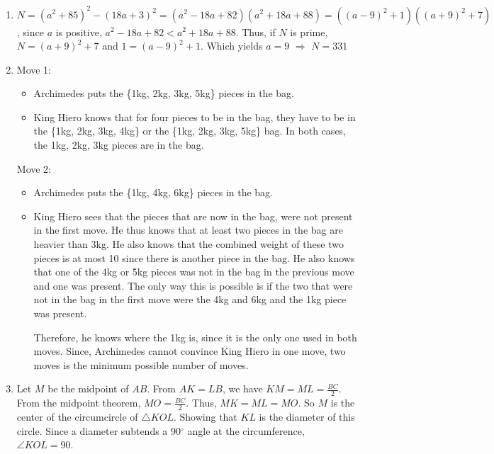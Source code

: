 \documentclass{article}
\begin{document}
\begin{enumerate}
\item $N =(a^{2} + 85)^{2} - (18a+3)^{2} = (a^{2} -18a + 82)(a^{2} + 18a + 88) = ((a-9)^{2} + 1)((a+9)^{2} + 7)$, since $a$ is positive, $a^{2} -18a + 82 < a^{2} + 18a + 88$. Thus, if $N$ is prime, $N = (a+9)^{2} + 7$ and $1 = (a-9)^{2} + 1$. Which yields $a = 9$ $\Rightarrow$ $N = 331$

\item Move 1:
\begin{itemize}
    \item Archimedes puts the \{1kg, 2kg, 3kg, 5kg\} pieces in the bag.
    \item King Hiero knows that for four pieces to be in the bag, they have to be in the \{1kg, 2kg, 3kg, 4kg\} or the \{1kg, 2kg, 3kg, 5kg\} bag. In both cases, the 1kg, 2kg, 3kg pieces are in the bag.
\end{itemize}
Move 2:
\begin{itemize}
    \item Archimedes puts the \{1kg, 4kg, 6kg\} pieces in the bag.
    \item King Hiero sees that the pieces that are now in the bag, were not present in the first move. He thus knows that at least two pieces in the bag are heavier than 3kg. He also knows that the combined weight of these two pieces is at most 10 since there is another piece in the bag. He also knows that one of the 4kg or 5kg pieces was not in the bag in the previous move and one was present. The only way this is possible is if the two that were not in the bag in the first move were the 4kg and 6kg and the 1kg piece was present. 

    Therefore, he knows where the 1kg is, since it is the only one used in both moves. Since, Archimedes cannot convince King Hiero in one move, two moves is the minimum possible number of moves.
\end{itemize}

\item Let $M$ be the midpoint of $AB$. From $AK = LB$, we have $KM = ML = \frac{BC}{2}$. From the midpoint theorem, $MO = \frac{BC}{2}$. Thus, $MK = ML = MO$. So $M$ is the center of the circumcircle of $\triangle{KOL}$. Showing that $KL$ is the diameter of this circle. Since a diameter subtends a 90$^{\circ}$ angle at the circumference, $\angle{KOL} = 90$. 


\end{enumerate}
\end{document}
